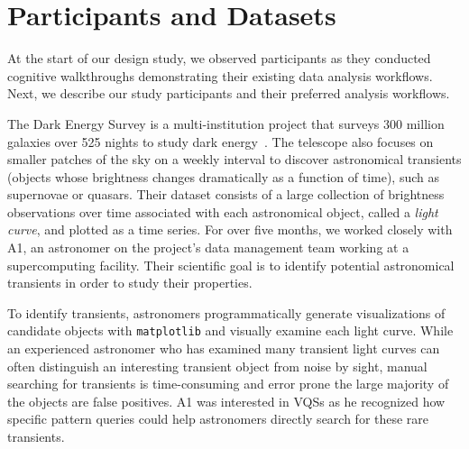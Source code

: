 \section{Participants and Datasets\label{sec:participantdatasets}}
At the start of our design study, we observed participants as they conducted cognitive walkthroughs demonstrating their existing data analysis workflows. Next, we describe our study participants and their preferred analysis workflows.%
\par\noindent{} The Dark Energy Survey is a multi-institution project that surveys 300 million galaxies over 525 nights to study dark energy~\cite{Drlica-Wagner2017}. The telescope  also focuses on smaller patches of the sky on a weekly interval to discover astronomical transients (objects whose brightness changes dramatically as a function of time), such as supernovae or quasars. Their dataset consists of a large collection of brightness observations over time associated with each astronomical object, called a {\em light curve}, and plotted as a time series. For over five months, we worked closely with A1, an astronomer on the project's data management team working at a supercomputing facility. Their scientific goal is to identify potential astronomical transients in order to study their properties. 
\par To identify transients, astronomers programmatically generate visualizations of candidate objects with \texttt{matplotlib} and visually examine each light curve. While an experienced astronomer who has examined many transient light curves can often distinguish an interesting transient object from noise by sight, manual searching for transients is time-consuming and error prone the large majority of the objects are false positives. A1 was interested in VQSs as he recognized how specific pattern queries could help astronomers directly search for these rare transients.
